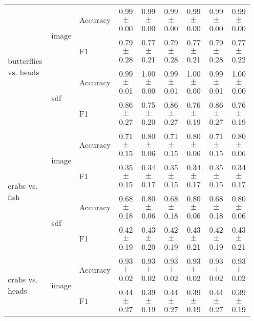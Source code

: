 \documentclass[anon,11pt]{9520} %
\begin{document}
\begin{table}
\begin{center}
\begin{tabular}{l|l|l|cc|cc|cc|}
\multirow{4}{*}{butterflies vs. heads}
& \multirow{2}{*}{image} & \multirow{1}{*}{Accuracy}& 0.99$\pm$0.00& 0.99$\pm$0.00& 0.99$\pm$0.00& 0.99$\pm$0.00& 0.99$\pm$0.00& 0.99$\pm$0.00\\ 
& & \multirow{1}{*}{F1}& 0.79$\pm$0.28& 0.77$\pm$0.21& 0.79$\pm$0.28& 0.77$\pm$0.21& 0.79$\pm$0.28& 0.77$\pm$0.22\\ \cline{2-9} 

& \multirow{2}{*}{sdf} & \multirow{1}{*}{Accuracy}& 0.99$\pm$0.01& 1.00$\pm$0.00& 0.99$\pm$0.01& 1.00$\pm$0.00& 0.99$\pm$0.01& 1.00$\pm$0.00\\ 
& & \multirow{1}{*}{F1}& 0.86$\pm$0.27& 0.75$\pm$0.20& 0.86$\pm$0.27& 0.76$\pm$0.19& 0.86$\pm$0.27& 0.76$\pm$0.19\\ \cline{2-9} 

\multirow{4}{*}{crabs vs. fish}
& \multirow{2}{*}{image} & \multirow{1}{*}{Accuracy}& 0.71$\pm$0.15& 0.80$\pm$0.06& 0.71$\pm$0.15& 0.80$\pm$0.06& 0.71$\pm$0.15& 0.80$\pm$0.06\\ 
& & \multirow{1}{*}{F1}& 0.35$\pm$0.15& 0.34$\pm$0.17& 0.35$\pm$0.15& 0.34$\pm$0.17& 0.35$\pm$0.15& 0.34$\pm$0.17\\ \cline{2-9} 

& \multirow{2}{*}{sdf} & \multirow{1}{*}{Accuracy}& 0.68$\pm$0.18& 0.80$\pm$0.06& 0.68$\pm$0.18& 0.80$\pm$0.06& 0.68$\pm$0.18& 0.80$\pm$0.06\\ 
& & \multirow{1}{*}{F1}& 0.42$\pm$0.19& 0.43$\pm$0.20& 0.42$\pm$0.19& 0.43$\pm$0.21& 0.42$\pm$0.19& 0.43$\pm$0.21\\ \cline{2-9} 

\multirow{4}{*}{crabs vs. heads}
& \multirow{2}{*}{image} & \multirow{1}{*}{Accuracy}& 0.93$\pm$0.02& 0.93$\pm$0.02& 0.93$\pm$0.02& 0.93$\pm$0.02& 0.93$\pm$0.02& 0.93$\pm$0.02\\ 
& & \multirow{1}{*}{F1}& 0.44$\pm$0.27& 0.39$\pm$0.19& 0.44$\pm$0.27& 0.39$\pm$0.19& 0.44$\pm$0.27& 0.39$\pm$0.19\\ \cline{2-9} 


\end{tabular}
\end{center}
\end{table}
\end{document}
